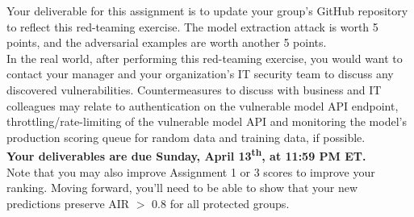 \documentclass[fleqn]{article}
\begin{document}
Your deliverable for this assignment is to update your group's GitHub repository to reflect this red-teaming exercise. The model extraction attack is worth 5 points, and the adversarial examples are worth another 5 points. \\

\noindent In the real world, after performing this red-teaming exercise, you would want to contact your manager and your organization's IT security team to discuss any discovered vulnerabilities. Countermeasures to discuss with business and IT colleagues may relate to authentication on the vulnerable model API endpoint, throttling/rate-limiting of the vulnerable model API and monitoring the model's production scoring queue for random data and training data, if possible.\\

\noindent \textbf{Your deliverables are due Sunday, April 13\textsuperscript{th}, at 11:59 PM ET.}\\

\noindent Note that you may also improve Assignment 1 or 3 scores to improve your ranking. Moving forward, you'll need to be able to show that your new predictions preserve AIR $>$ 0.8 for all protected groups.
\end{document}
